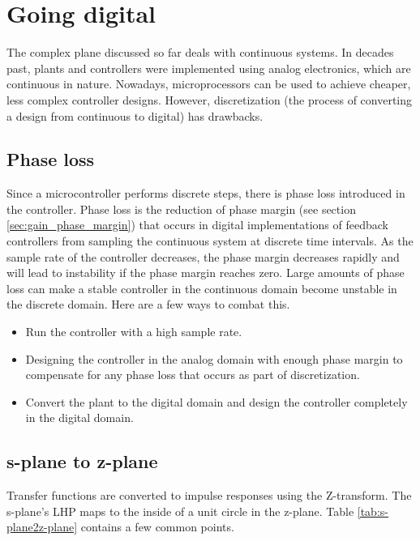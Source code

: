\section{Going digital}

The complex plane discussed so far deals with continuous \glspl{system}. In
decades past, \glspl{plant} and controllers were implemented using analog
electronics, which are continuous in nature. Nowadays, microprocessors can be
used to achieve cheaper, less complex controller designs. However,
discretization (the process of converting a design from continuous to digital)
has drawbacks.

\subsection{Phase loss}

Since a microcontroller performs discrete steps, there is phase loss introduced
in the controller. Phase loss is the reduction of phase margin (see section
\ref{sec:gain_phase_margin}) that occurs in digital implementations of feedback
controllers from sampling the continuous system at discrete time intervals. As
the sample rate of the controller decreases, the phase margin decreases rapidly
and will lead to instability if the phase margin reaches zero. Large amounts of
phase loss can make a stable controller in the continuous domain become unstable
in the discrete domain. Here are a few ways to combat this.

\begin{itemize}
  \item Run the controller with a high sample rate.
  \item Designing the controller in the analog domain with enough phase margin
    to compensate for any phase loss that occurs as part of discretization.
  \item Convert the \gls{plant} to the digital domain and design the controller
    completely in the digital domain.
\end{itemize}

\subsection{s-plane to z-plane}

Transfer functions are converted to impulse responses using the Z-transform. The
s-plane's LHP maps to the inside of a unit circle in the z-plane. Table
\ref{tab:s-plane2z-plane} contains a few common points. \\

